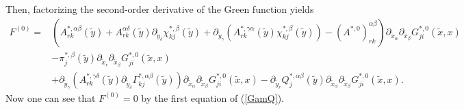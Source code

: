 \documentclass[11pt, reqno]{amsart}
\theoremstyle{definition}
\theoremstyle{remark}
\numberwithin{equation}{section}
\begin{document}
	Then, factorizing the second-order derivative of the Green function yields
	\begin{align*}
		F^{(0)}
		=&	 \left( A^{*,\alpha\beta}_{rk}(\tilde{y})+	 A^{\alpha\delta}_{rk}(\tilde{y})\partial_{\tilde{y}_\delta} \chi^{*,\beta}_{kj}(\tilde{y})+\partial_{\tilde{y}_\gamma}(  A^{*,\gamma\alpha}_{rk}(\tilde{y}) \chi^{*,\beta}_{kj}(\tilde{y}))-  (A^{*,0})^{\alpha\beta}_{rk}\right)\partial_{\tilde{x}_\alpha}\partial_{\tilde{x}_{\beta}} G_{ji}^{*,0} (\tilde{x},x)\\
		&- \pi^{*,\beta}_{j}(\tilde{y}) \partial_{\tilde{x}_r}\partial_{\tilde{x}_{\beta}} G_{ji}^{*,0}  (\tilde{x},x)\\
		&+\partial_{\tilde{y}_\gamma} ( A^{*,\gamma\delta}_{rk}(\tilde{y})\partial_{\tilde{y}_\delta}\Gamma^{*,\alpha\beta}_{kj}(\tilde{y}))\partial_{ \tilde{x}_{\alpha}} \partial_{\tilde{x}_{\beta}} G_{ji}^{*,0}  (\tilde{x},x)	-   \partial_{\tilde{y}_r} Q^{*,\alpha\beta}_{j}(\tilde{y})\partial_{ \tilde{x}_{\alpha}} \partial_{\tilde{x}_{\beta}} G_{ji}^{*,0}  (\tilde{x},x).
	\end{align*}
	Now one can see that $F^{(0)}=0$ by the first equation of (\ref{GamQ}).\\
	
\end{document}
